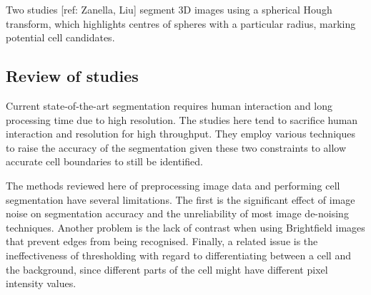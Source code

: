 Two studies [ref: Zanella, Liu] segment 3D images using a spherical Hough transform, which highlights centres of spheres with a particular radius, marking potential cell candidates.

\subsection{Review of studies}

Current state-of-the-art segmentation requires human interaction and long processing time due to high resolution. The studies here tend to sacrifice human interaction and resolution for high throughput. They employ various techniques to raise the accuracy of the segmentation given these two constraints to allow accurate cell boundaries to still be identified.

The methods reviewed here of preprocessing image data and performing cell segmentation have several limitations. The first is the significant effect of image noise on segmentation accuracy and the unreliability of most image de-noising techniques. Another problem is the lack of contrast when using Brightfield images that prevent edges from being recognised. Finally, a related issue is the ineffectiveness of thresholding with regard to differentiating between a cell and the background, since different parts of the cell might have different pixel intensity values.
